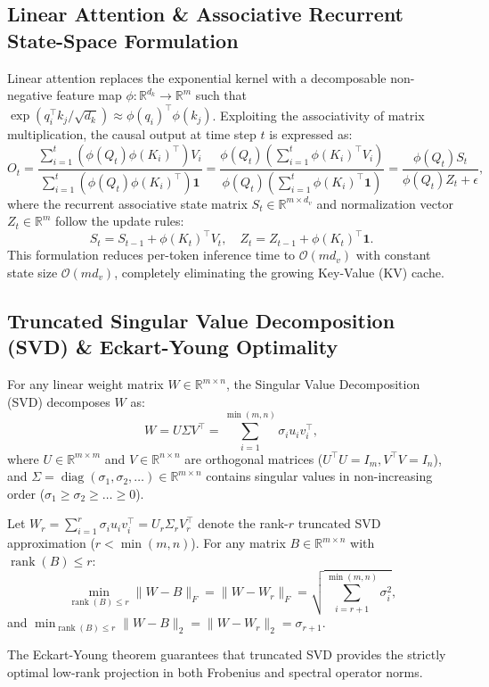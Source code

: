 \subsection{Linear Attention \& Associative Recurrent State-Space Formulation}
Linear attention replaces the exponential kernel with a decomposable non-negative feature map $\phi: \mathbb{R}^{d_k} \to \mathbb{R}^{m}$ such that $\exp(q_i^\top k_j / \sqrt{d_k}) \approx \phi(q_i)^\top \phi(k_j)$. Exploiting the associativity of matrix multiplication, the causal output at time step $t$ is expressed as:
\begin{equation}
O_t = \frac{\sum_{i=1}^t \left(\phi(Q_t) \phi(K_i)^\top\right) V_i}{\sum_{i=1}^t \left(\phi(Q_t) \phi(K_i)^\top\right) \mathbf{1}} = \frac{\phi(Q_t) \left(\sum_{i=1}^t \phi(K_i)^\top V_i\right)}{\phi(Q_t) \left(\sum_{i=1}^t \phi(K_i)^\top \mathbf{1}\right)} = \frac{\phi(Q_t) S_t}{\phi(Q_t) Z_t + \epsilon},
\end{equation}
where the recurrent associative state matrix $S_t \in \mathbb{R}^{m \times d_v}$ and normalization vector $Z_t \in \mathbb{R}^m$ follow the update rules:
\begin{equation}
S_t = S_{t-1} + \phi(K_t)^\top V_t, \quad Z_t = Z_{t-1} + \phi(K_t)^\top \mathbf{1}.
\end{equation}
This formulation reduces per-token inference time to $\mathcal{O}(m d_v)$ with constant state size $\mathcal{O}(m d_v)$, completely eliminating the growing Key-Value (KV) cache.

\subsection{Truncated Singular Value Decomposition (SVD) \& Eckart-Young Optimality}
For any linear weight matrix $W \in \mathbb{R}^{m \times n}$, the Singular Value Decomposition (SVD) decomposes $W$ as:
\begin{equation}
W = U \Sigma V^\top = \sum_{i=1}^{\min(m,n)} \sigma_i u_i v_i^\top,
\end{equation}
where $U \in \mathbb{R}^{m \times m}$ and $V \in \mathbb{R}^{n \times n}$ are orthogonal matrices ($U^\top U = I_m, V^\top V = I_n$), and $\Sigma = \operatorname{diag}(\sigma_1, \sigma_2, \dots) \in \mathbb{R}^{m \times n}$ contains singular values in non-increasing order ($\sigma_1 \ge \sigma_2 \ge \dots \ge 0$).

\begin{theorem}
Let $W_r = \sum_{i=1}^r \sigma_i u_i v_i^\top = U_r \Sigma_r V_r^\top$ denote the rank-$r$ truncated SVD approximation ($r < \min(m,n)$). For any matrix $B \in \mathbb{R}^{m \times n}$ with $\operatorname{rank}(B) \le r$:
\begin{equation}
\min_{\operatorname{rank}(B) \le r} \|W - B\|_F = \|W - W_r\|_F = \sqrt{\sum_{i=r+1}^{\min(m,n)} \sigma_i^2},
\end{equation}
and $\min_{\operatorname{rank}(B) \le r} \|W - B\|_2 = \|W - W_r\|_2 = \sigma_{r+1}$.
\end{theorem}
The Eckart-Young theorem guarantees that truncated SVD provides the strictly optimal low-rank projection in both Frobenius and spectral operator norms.

